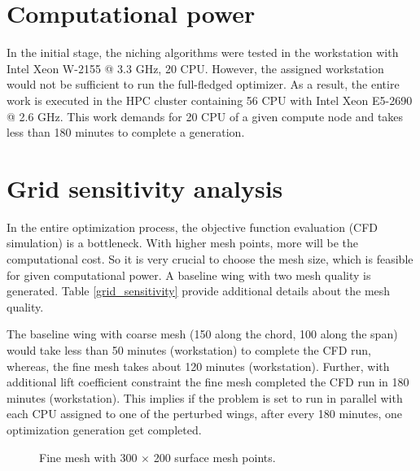 \section{Computational power}
In the initial stage, the niching algorithms were tested in the workstation with Intel Xeon W-2155 @ 3.3 GHz, 20 CPU. However, the assigned workstation would not be sufficient to run the full-fledged optimizer. As a result, the entire work is executed in the HPC cluster containing 56 CPU with Intel Xeon E5-2690 @ 2.6 GHz. This work demands for 20 CPU of a given compute node and takes less than 180 minutes to complete a generation.

\section{Grid sensitivity analysis}
In the entire optimization process, the objective function evaluation (CFD simulation) is a bottleneck. With higher mesh points, more will be the computational cost. So it is very crucial to choose the mesh size, which is feasible for given computational power. A baseline wing with two mesh quality is generated. Table \ref{grid_sensitivity} provide additional details about the mesh quality.


The baseline wing with coarse mesh (150 along the chord, 100 along the span) would take less than 50 minutes (workstation) to complete the CFD run, whereas, the fine mesh takes about 120 minutes (workstation). Further, with additional lift coefficient constraint the fine mesh completed the CFD run in 180 minutes (workstation). This implies if the problem is set to run in parallel with each CPU assigned to one of the perturbed wings, after every 180 minutes, one optimization generation get completed. 
\begin{figure}[!htbp]
    \centering
    \caption{Fine mesh with 300 $\times$ 200 surface mesh points.}
    \label{fine_mesh}
\end{figure}

